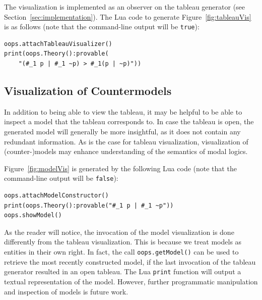 The visualization is implemented as an observer on the tableau generator
(see Section~\ref{sec:implementation}).
The Lua code to generate
Figure~\ref{fig:tableauVis} is as follows (note that the command-line output
will be \lstinline!true!):
\begin{lstlisting}
oops.attachTableauVisualizer()
print(oops.Theory():provable(
	"(#_1 p | #_1 ~p) > #_1(p | ~p)"))
\end{lstlisting}

\subsection{Visualization of Countermodels}

In addition to being able to view the tableau, it may be helpful to be able to
inspect a model that the tableau corresponds to.
In case the tableau is open, the generated model will generally be more
insightful, as it does not contain any redundant information.
As is the case for tableau visualization, visualization of (counter-)models may
enhance understanding of the semantics of modal logics.



Figure~\ref{fig:modelVis} is generated by the following Lua code (note that
the command-line output will be \lstinline!false!):
\begin{lstlisting}
oops.attachModelConstructor()
print(oops.Theory():provable("#_1 p | #_1 ~p"))
oops.showModel() 
\end{lstlisting}
As the reader will notice, the invocation of the model visualization is done
differently from the tableau visualization.
This is because we treat models as entities in their own right.
In fact, the call \lstinline!oops.getModel()!  can be used to retrieve the most
recently constructed model, if the last invocation of the tableau generator
resulted in an open tableau.
The Lua \lstinline!print! function will output a textual representation of the
model.
However, further programmatic manipulation and inspection of models is future
work.
